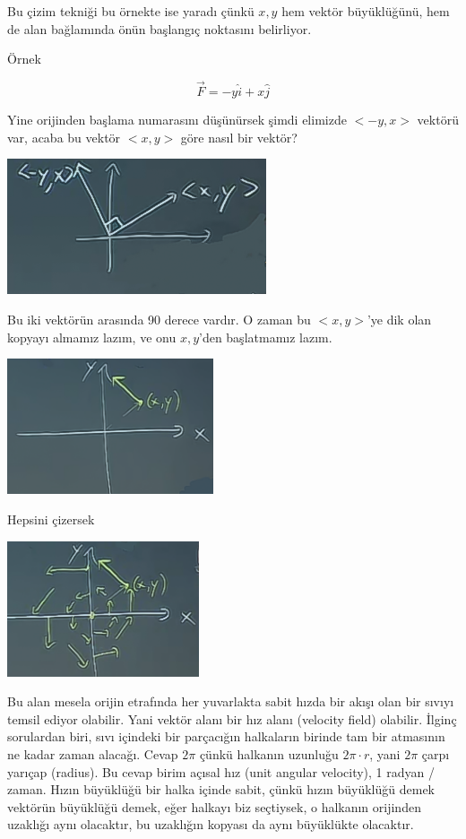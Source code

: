 \documentclass[12pt,fleqn]{article}\usepackage{../../common}
\begin{document}
Bu çizim tekniği bu örnekte ise yaradı çünkü $x,y$ hem vektör büyüklüğünü,
hem de alan bağlamında önün başlangıç noktasını belirliyor. 

Örnek

$$ \vec{F} = -y\hat{i} + x\hat{j} $$

Yine orijinden başlama numarasını düşünürsek şimdi elimizde $< -y,x >$
vektörü var, acaba bu vektör $< x,y >$ göre nasıl bir vektör? 

\begin{center}
\includegraphics[height=4cm]{19_5.png}
\end{center}

Bu iki vektörün arasında 90 derece vardır. O zaman bu $< x,y >$'ye dik olan
kopyayı almamız lazım, ve onu $x,y$'den başlatmamız lazım. 

\begin{center}
\includegraphics[height=4cm]{19_6.png}
\end{center}

Hepsini çizersek

\begin{center}
\includegraphics[height=4cm]{19_7.png}
\end{center}

Bu alan mesela orijin etrafında her yuvarlakta sabit hızda bir akışı olan bir
sıvıyı temsil ediyor olabilir. Yani vektör alanı bir hız alanı (velocity field)
olabilir. İlginç sorulardan biri, sıvı içindeki bir parçacığın halkaların
birinde tam bir atmasının ne kadar zaman alacağı. Cevap $2\pi$ çünkü halkanın
uzunluğu $2\pi \cdot r$, yani $2\pi$ çarpı yarıçap (radius). Bu cevap birim
açısal hız (unit angular velocity), 1 radyan / zaman. Hızın büyüklüğü bir halka
içinde sabit, çünkü hızın büyüklüğü demek vektörün büyüklüğü demek, eğer halkayı
biz seçtiysek, o halkanın orijinden uzaklığı aynı olacaktır, bu uzaklığın
kopyası da aynı büyüklükte olacaktır.
\end{document}
